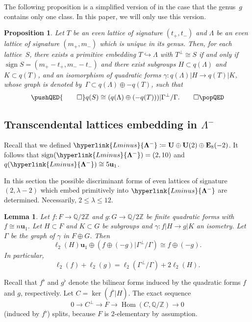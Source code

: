 \documentclass[a4paper]{amsart}
\theoremstyle{definition}
\theoremstyle{plain}
\newtheorem{lemma}[definition]{Lemma}
\newtheorem{proposition}[definition]{Proposition}
\DeclareMathOperator{\Hom}{Hom}
\DeclareMathOperator{\sign}{sign}
\newcommand{\IQ}{\mathbb{Q}}
\newcommand{\IZ}{\mathbb{Z}}
\newcommand{\bE}{\mathbf{E}}
\newcommand{\bU}{\mathbf{U}}
\newcommand{\bu}{\mathbf{u}}
\newcommand{\bLambda}{\mathbf{\Lambda}}
\newcommand{\Lminus}{\hyperlink{Lminus}{\bLambda^-}}
\begin{document}
The following proposition is a simplified version of  in the case that the genus~\(g\) contains only one class. In this paper, we will only use this version.

\begin{proposition} 
\label{prop:Nikulin1.15.1-discriminant-form-orthogonal}
Let \(T\) be an even lattice of signature \((t_+,t_-)\) and \(\Lambda\) be an even lattice of signature \((m_+,m_-)\) which is unique in its genus. 
Then, for each lattice~\(S\), there exists a primitive embedding \(T \hookrightarrow \Lambda\) with \(T^\perp \cong S\) if and only if \(\sign S = (m_+ - t_+, m_- - t_-)\) and
there exist subgroups \(H \subset q(\Lambda)\) and \(K \subset q(T)\), and an isomorphism of quadratic forms \(\gamma\colon q(\Lambda)|H \rightarrow q(T)|K\), whose graph is denoted by~\(\Gamma\subset q(\Lambda) \oplus -q(T)\), such that 
\[
\pushQED{\qed} 
 q(S) \cong (q(\Lambda) \oplus (-q(T))) | \Gamma^\perp/\Gamma. \qedhere
\popQED
\]
\end{proposition}

\subsection{Transcendental lattices embedding in \texorpdfstring{\(\Lambda^-\)}{Lambda minus}} \label{sec:T-embedding-in-Lminus}

Recall that we defined \(\Lminus \coloneqq \bU \oplus \bU(2) \oplus \bE_8(-2)\). It follows that \(\sign(\Lminus) = (2,10)\) and \(q(\Lminus) \cong 5\bu_1\).

In this section the possible discriminant forms of even lattices of signature \((2, \lambda - 2)\) which embed primitively into \(\Lminus\) are determined. Necessarily, \(2 \leq \lambda \leq 12\).

\begin{lemma} \label{lem:technical}
Let \(f \colon F \rightarrow \IQ/2\IZ\) and \(g \colon G \rightarrow \IQ/2\IZ\) be finite quadratic forms with \(f \cong n \bu_1\). 
Let \(H \subset F\) and \(K \subset G\) be subgroups and \(\gamma \colon f|H \rightarrow g|K\) an isometry. 
Let \(\Gamma\) be the graph of \(\gamma\) in \(F \oplus G\). Then
\[
 \ell_2(H)\bu_1 \oplus \left(f \oplus (-g) | \Gamma^\perp/\Gamma\right) \cong f \oplus (-g).
\]
In particular,
\[
 \ell_2(f) + \ell_2(g) = \ell_2(\Gamma^\perp/\Gamma) + 2\ell_2(H).
\]
\end{lemma}
\proof
Recall that \(f^\flat\) and \(g^\flat\) denote the bilinear forms induced by the quadratic forms \(f\) and \(g\), respectively.
Let \(C=\ker (f^\flat|H)\). 
The exact sequence 
\[
 0 \rightarrow C^\perp \rightarrow F \rightarrow \Hom(C, \IQ/\IZ) \rightarrow 0
\]
(induced by \(f^\flat\)) splits, because \(F\) is \(2\)-elementary by assumption.
\end{document}
